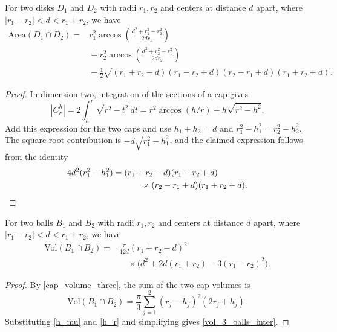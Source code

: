 \documentclass[12pt]{amsart}
\numberwithin{equation}{section}
\begin{document}
\begin{corollary}[$n=2$]
For two disks $D_1$ and $D_2$ with radii $r_1,r_2$ and centers at
distance $d$ apart, where $|r_1-r_2|<d<r_1+r_2$, we have
\begin{equation}
\begin{aligned}
\text{Area}(D_1\cap D_2)
={}&r_1^2\arccos\!\left(\frac{d^2+r_1^2-r_2^2}{2dr_1}\right)\\
&{}+r_2^2\arccos\!\left(\frac{d^2+r_2^2-r_1^2}{2dr_2}\right)\\
&{}-\frac12\sqrt{(r_1+r_2-d)(r_1-r_2+d)
                 (r_2-r_1+d)(r_1+r_2+d)}.
\end{aligned}
\end{equation}
\end{corollary}

\begin{proof}
In dimension two, integration of the sections of a cap gives
\[
|C_r^h|=2\int_h^r\sqrt{r^2-t^2}\,dt
=r^2\arccos(h/r)-h\sqrt{r^2-h^2}.
\]
Add this expression for the two caps and use
$h_1+h_2=d$ and $r_1^2-h_1^2=r_2^2-h_2^2$.
The square-root contribution is $-d\sqrt{r_1^2-h_1^2}$,
and the claimed expression follows from the identity
\begin{align*}
4d^2(r_1^2-h_1^2)
={}&(r_1+r_2-d)(r_1-r_2+d)\\
&\qquad{}\times(r_2-r_1+d)(r_1+r_2+d).\qedhere
\end{align*}
\end{proof}

\begin{corollary}[$n=3$]
For two balls $B_1$ and $B_2$ with radii $r_1,r_2$ and centers at
distance $d$ apart, where $|r_1-r_2|<d<r_1+r_2$, we have
\begin{equation}
\label{vol_3_balls_inter}
\begin{aligned}
\text{Vol}(B_1\cap B_2)
={}&\frac{\pi}{12d}(r_1+r_2-d)^2\\
&\quad{}\times\bigl(d^2+2d(r_1+r_2)-3(r_1-r_2)^2\bigr).
\end{aligned}
\end{equation}
\end{corollary}

\begin{proof}
By \eqref{cap_volume_three}, the sum of the two cap volumes is
\[
\text{Vol}(B_1\cap B_2)
=\frac{\pi}{3}\sum_{j=1}^2(r_j-h_j)^2(2r_j+h_j).
\]
Substituting \eqref{h_mu} and \eqref{h_r} and simplifying gives
\eqref{vol_3_balls_inter}.
\end{proof}
\FloatBarrier
\end{document}

